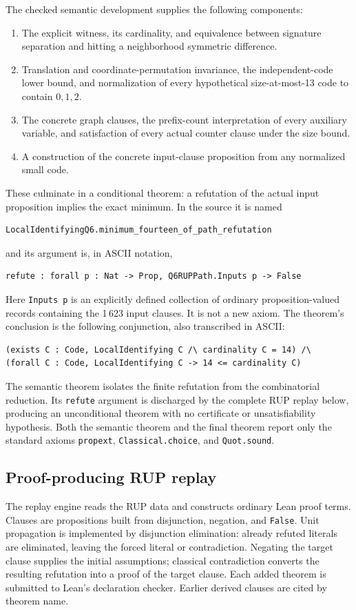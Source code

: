 \documentclass[11pt]{article}
\begin{document}
The checked semantic development supplies the following components:
\begin{enumerate}
\item The explicit witness, its cardinality, and equivalence between signature separation and hitting a neighborhood symmetric difference.
\item Translation and coordinate-permutation invariance, the independent-code lower bound, and normalization of every hypothetical size-at-most-13 code to contain $0,1,2$.
\item The concrete graph clauses, the prefix-count interpretation of every auxiliary variable, and satisfaction of every actual counter clause under the size bound.
\item A construction of the concrete input-clause proposition from any normalized small code.
\end{enumerate}
These culminate in a conditional theorem: a refutation of the actual input proposition implies the exact minimum. In the source it is named
\begin{lstlisting}
LocalIdentifyingQ6.minimum_fourteen_of_path_refutation
\end{lstlisting}
and its argument is, in ASCII notation,
\begin{lstlisting}
refute : forall p : Nat -> Prop, Q6RUPPath.Inputs p -> False
\end{lstlisting}
Here \texttt{Inputs p} is an explicitly defined collection of ordinary proposition-valued records containing the 1\,623 input clauses. It is not a new axiom. The theorem's conclusion is the following conjunction, also transcribed in ASCII:
\begin{lstlisting}
(exists C : Code, LocalIdentifying C /\ cardinality C = 14) /\
(forall C : Code, LocalIdentifying C -> 14 <= cardinality C)
\end{lstlisting}
The semantic theorem isolates the finite refutation from the combinatorial reduction. Its \texttt{refute} argument is discharged by the complete RUP replay below, producing an unconditional theorem with no certificate or unsatisfiability hypothesis. Both the semantic theorem and the final theorem report only the standard axioms \texttt{propext}, \texttt{Classical.choice}, and \texttt{Quot.sound}.

\subsection{Proof-producing RUP replay}
The replay engine reads the RUP data and constructs ordinary Lean proof terms. Clauses are propositions built from disjunction, negation, and \texttt{False}. Unit propagation is implemented by disjunction elimination: already refuted literals are eliminated, leaving the forced literal or contradiction. Negating the target clause supplies the initial assumptions; classical contradiction converts the resulting refutation into a proof of the target clause. Each added theorem is submitted to Lean's declaration checker. Earlier derived clauses are cited by theorem name.
\end{document}
